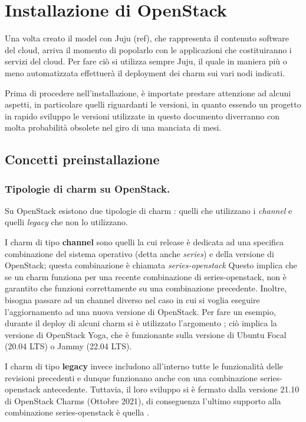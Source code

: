 \chapter{Installazione di OpenStack}
Una volta creato il model con Juju (ref), che rappresenta il contenuto software del cloud, arriva il momento di popolarlo con le applicazioni che costituiranno i servizi del cloud.
% 
Per fare ciò si utilizza sempre Juju, il quale in maniera più o meno automatizzata effettuerà il deployment dei charm sui vari nodi indicati.

Prima di procedere nell'installazione, è importate prestare attenzione ad alcuni aspetti, in particolare quelli riguardanti le versioni, in quanto essendo un progetto in rapido sviluppo le versioni utilizzate in questo documento diverranno con molta probabilità obsolete nel giro di una manciata di mesi.


\section{Concetti preinstallazione}
\subsection{Tipologie di charm su OpenStack.} 
Su OpenStack esistono due tipologie di charm \cite{openstack_charms_type}: quelli che utilizzano i \emph{channel} e quelli \emph{legacy} che non lo utilizzano.

I charm di tipo \textbf{channel} sono quelli la cui release è dedicata ad una specifica combinazione del sistema operativo (detta anche \emph{series}) e della versione di OpenStack;
% 
questa combinazione è chiamata \emph{series-openstack}
% 
Questo implica che se un charm funziona per una recente combinazione di series-openstack, non è garantito che funzioni correttamente su una combinazione precedente.
% 
Inoltre, bisogna passare ad un channel diverso nel caso in cui si voglia eseguire l'aggiornamento ad una nuova versione di OpenStack. 
% 
Per fare un esempio, durante il deploy di alcuni charm si è utilizzato l'argomento ; ciò implica la versione di OpenStack Yoga, che è funzionante sulla versione di Ubuntu Focal (20.04 LTS) o Jammy (22.04 LTS).

I charm di tipo \textbf{legacy} invece includono all'interno tutte le funzionalità delle revisioni precedenti e dunque funzionano anche con una combinazione series-openstack antecedente.
% 
Tuttavia, il loro sviluppo si è fermato dalla versione 21.10 di OpenStack Charms (Ottobre 2021), di conseguenza l'ultimo supporto alla combinazione series-openstack è quella .

